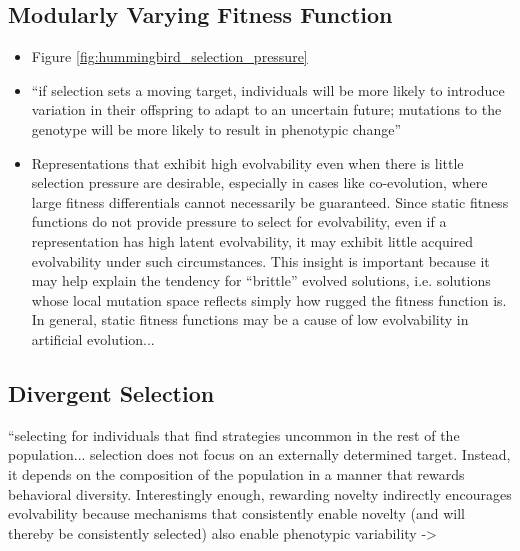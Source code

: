 \subsection{Modularly Varying Fitness Function} \label{sec:mvff}
  \begin{itemize}
    \item Figure \ref{fig:hummingbird_selection_pressure}
    \item ``if selection sets a moving target, individuals will be more likely to introduce variation in their offspring to adapt to an uncertain future; mutations to the genotype will be more likely to result in phenotypic change'' \cite{Wilder2015ReconcilingEvolvability}
    \item \begin{displayquote}
    Representations that exhibit high evolvability even when there is little selection pressure are desirable, especially in cases like co-evolution, where large fitness differentials cannot necessarily be guaranteed. Since  static  fitness  functions  do  not  provide  pressure  to select for evolvability, even if a representation has high latent evolvability, it may exhibit little acquired evolvability under  such  circumstances.   This  insight  is  important  because it may help explain the tendency for “brittle” evolved solutions, i.e. solutions whose local mutation space reflects simply how rugged the fitness function is.  In general, static fitness functions may be a cause of low evolvability in artificial evolution... \cite{Reisinger2006SelectingRepresentations}
      \end{displayquote}
  \end{itemize}
  
  \subsection{Divergent Selection} \label{sec:divergent_selection}
``selecting for individuals that find strategies uncommon in the rest of the population... selection does not focus on an externally determined target. Instead, it depends on the composition of the population in a manner that rewards behavioral diversity. \cite{Wilder2015ReconcilingEvolvability}
   Interestingly enough, rewarding novelty indirectly encourages evolvability because mechanisms that consistently enable novelty (and will thereby be consistently selected) also enable phenotypic variability \cite{Mengistu2016EvolvabilityIt} -> \cite{Lehman2011ImprovingSelf-Adaptation}
